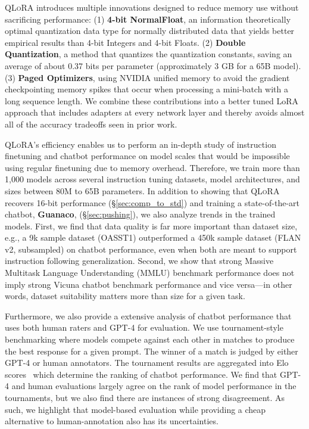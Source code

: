 \textsc{QLoRA} introduces multiple innovations designed to reduce memory use without sacrificing performance: (1) \textbf{4-bit NormalFloat}, an information theoretically optimal quantization data type for normally distributed data that yields better empirical results than 4-bit Integers and 4-bit Floats. (2) \textbf{Double Quantization}, a method that quantizes the quantization constants, saving an average of about 0.37 bits per parameter (approximately 3 GB for a 65B model). (3) \textbf{Paged Optimizers}, using NVIDIA unified memory to avoid the gradient checkpointing memory spikes that occur when processing a mini-batch with a long sequence length. We combine these contributions into a better tuned LoRA approach that includes adapters at every network layer and thereby avoids almost all of the accuracy tradeoffs seen in prior work.

\textsc{QLoRA}'s efficiency enables us to perform an in-depth study of instruction finetuning and chatbot performance on model scales that would be impossible using regular finetuning due to memory overhead. Therefore, we train more than 1,000 models across several instruction tuning datasets, model architectures, and sizes between 80M to 65B parameters. In addition to showing that \textsc{QLoRA} recovers 16-bit performance (\S\ref{sec:comp_to_std}) and training a state-of-the-art chatbot, \textbf{Guanaco}, (\S\ref{sec:pushing}), we also analyze trends in the trained models. First, we find that data quality is far more important than dataset size, e.g., a 9k sample dataset (OASST1) outperformed a 450k sample dataset (FLAN v2, subsampled) on chatbot performance, even when both are meant to support instruction following generalization. Second, we show that strong Massive Multitask Language Understanding (MMLU) benchmark performance does not imply strong Vicuna chatbot benchmark performance and vice versa—in other words, dataset suitability matters more than size for a given task. 

Furthermore, we also provide a extensive analysis of chatbot performance that uses both human raters and GPT-4 for evaluation. We use tournament-style benchmarking where models compete against each other in matches to produce the best response for a given prompt. The winner of a match is judged by either GPT-4 or human annotators. The tournament results are aggregated into Elo scores~\citep{elo1967proposed, elo1978rating} which determine the ranking of chatbot performance. We find that GPT-4 and human evaluations largely agree on the rank of model performance in the tournaments, but we also find there are instances of strong disagreement. As such, we highlight that model-based evaluation while providing a cheap alternative to human-annotation also has its uncertainties. 

